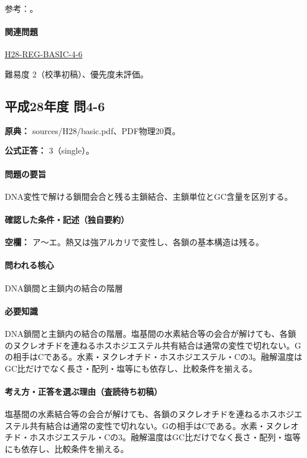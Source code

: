 \par 参考：\cite{bu_dna_melting,nhgri_dna}。

\paragraph{関連問題} \hyperref[q:h28-reg-basic-4-6]{H28-REG-BASIC-4-6}

\par 難易度 2（校準初稿）、優先度未評価。

\subsection{平成28年度 問4-6}
\label{q:h28-reg-basic-4-6}

\noindent\textbf{原典：} sources/H28/basic.pdf、PDF物理20頁。

\textbf{公式正答：} 3（single）。

\paragraph{問題の要旨} DNA変性で解ける鎖間会合と残る主鎖結合、主鎖単位とGC含量を区別する。

\paragraph{確認した条件・記述（独自要約）}\mbox{}\par

\noindent\textbf{空欄：} ア〜エ。熱又は強アルカリで変性し、各鎖の基本構造は残る。\par

\paragraph{問われる核心} DNA鎖間と主鎖内の結合の階層

\paragraph{必要知識} DNA鎖間と主鎖内の結合の階層。塩基間の水素結合等の会合が解けても、各鎖のヌクレオチドを連ねるホスホジエステル共有結合は通常の変性で切れない。Gの相手はCである。水素・ヌクレオチド・ホスホジエステル・Cの3。融解温度はGC比だけでなく長さ・配列・塩等にも依存し、比較条件を揃える。

\paragraph{考え方・正答を選ぶ理由（査読待ち初稿）} 塩基間の水素結合等の会合が解けても、各鎖のヌクレオチドを連ねるホスホジエステル共有結合は通常の変性で切れない。Gの相手はCである。水素・ヌクレオチド・ホスホジエステル・Cの3。融解温度はGC比だけでなく長さ・配列・塩等にも依存し、比較条件を揃える。

